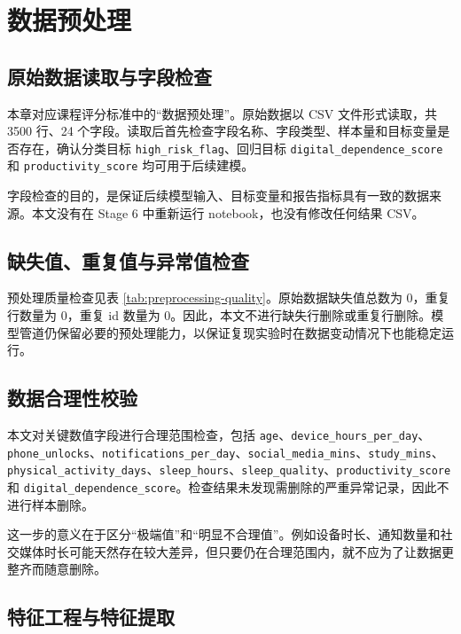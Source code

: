 \chapter{数据预处理}

\section{原始数据读取与字段检查}

本章对应课程评分标准中的“数据预处理”。原始数据以 CSV 文件形式读取，共 3500 行、24 个字段。读取后首先检查字段名称、字段类型、样本量和目标变量是否存在，确认分类目标 \texttt{high\_risk\_flag}、回归目标 \texttt{digital\_dependence\_score} 和 \texttt{productivity\_score} 均可用于后续建模。

字段检查的目的，是保证后续模型输入、目标变量和报告指标具有一致的数据来源。本文没有在 Stage 6 中重新运行 notebook，也没有修改任何结果 CSV。

\section{缺失值、重复值与异常值检查}

预处理质量检查见表 \ref{tab:preprocessing-quality}。原始数据缺失值总数为 0，重复行数量为 0，重复 id 数量为 0。因此，本文不进行缺失行删除或重复行删除。模型管道仍保留必要的预处理能力，以保证复现实验时在数据变动情况下也能稳定运行。



\section{数据合理性校验}

本文对关键数值字段进行合理范围检查，包括 \texttt{age}、\texttt{device\_hours\_per\_day}、\texttt{phone\_unlocks}、\texttt{notifications\_per\_day}、\texttt{social\_media\_mins}、\texttt{study\_mins}、\texttt{physical\_activity\_days}、\texttt{sleep\_hours}、\texttt{sleep\_quality}、\texttt{productivity\_score} 和 \texttt{digital\_dependence\_score}。检查结果未发现需删除的严重异常记录，因此不进行样本删除。

这一步的意义在于区分“极端值”和“明显不合理值”。例如设备时长、通知数量和社交媒体时长可能天然存在较大差异，但只要仍在合理范围内，就不应为了让数据更整齐而随意删除。

\section{特征工程与特征提取}

